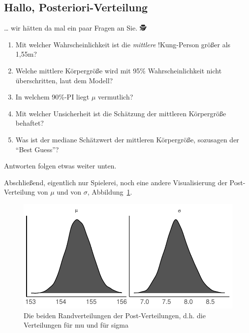 \documentclass[
  a4paper,
  DIV=11]{scrreprt}
\providecommand{\tightlist}{%
  \setlength{\itemsep}{0pt}\setlength{\parskip}{0pt}}\usepackage{longtable,booktabs,array}
\theoremstyle{definition}
\theoremstyle{remark}
\begin{document}
\hypertarget{hallo-posteriori-verteilung}{%
\subsection{Hallo,
Posteriori-Verteilung}\label{hallo-posteriori-verteilung}}

\ldots{} wir hätten da mal ein paar Fragen an Sie. 🕵

\begin{enumerate}
\def\labelenumi{\arabic{enumi}.}
\tightlist
\item
  Mit welcher Wahrscheinlichkeit ist die \emph{mittlere} !Kung-Person
  größer als 1,55m?
\item
  Welche mittlere Körpergröße wird mit 95\% Wahrscheinlichkeit nicht
  überschritten, laut dem Modell?
\item
  In welchem 90\%-PI liegt \(\mu\) vermutlich?
\item
  Mit welcher Unsicherheit ist die Schätzung der mittleren Körpergröße
  behaftet?
\item
  Was ist der mediane Schätzwert der mittleren Körpergröße, sozusagen
  der ``Best Guess''?
\end{enumerate}

Antworten folgen etwas weiter unten.

Abschließend, eigentlich nur Spielerei, noch eine andere Visualisierung
der Post-Verteilung von \(\mu\) und von \(\sigma\),
Abbildung~\ref{fig-kung3}.

\begin{figure}

{\centering \includegraphics{./gauss_files/figure-pdf/fig-kung3-1.pdf}

}

\caption{\label{fig-kung3}Die beiden Randverteilungen der
Post-Verteilungen, d.h. die Verteilungen für mu und für sigma}

\end{figure}
\end{document}
